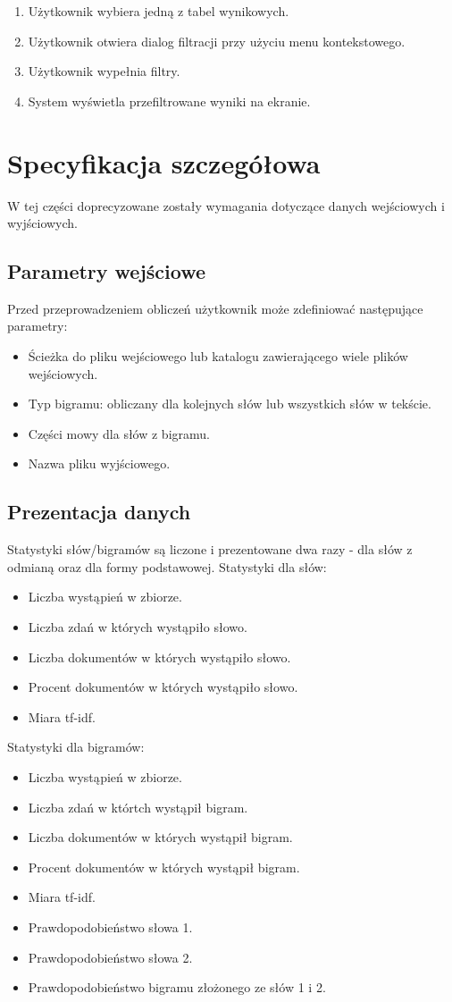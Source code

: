 \documentclass[11pt]{article}
\begin{document}
\begin{enumerate}
 \item Użytkownik wybiera jedną z tabel wynikowych.
 \item Użytkownik otwiera dialog filtracji przy użyciu menu kontekstowego.
 \item Użytkownik wypełnia filtry.
 \item System wyświetla przefiltrowane wyniki na ekranie.
\end{enumerate}

\section{Specyfikacja szczegółowa}
W tej części doprecyzowane zostały wymagania dotyczące danych wejściowych i wyjściowych.
\subsection{Parametry wejściowe}
Przed przeprowadzeniem obliczeń użytkownik może zdefiniować następujące parametry:
\begin{itemize}
 \item Ścieżka do pliku wejściowego lub katalogu zawierającego wiele plików wejściowych.
 \item Typ bigramu: obliczany dla kolejnych słów lub wszystkich słów w tekście.
 \item Części mowy dla słów z bigramu.
 \item Nazwa pliku wyjściowego.
\end{itemize}

\subsection{Prezentacja danych}
Statystyki słów/bigramów są liczone i prezentowane dwa razy - dla słów z odmianą oraz dla formy podstawowej.
Statystyki dla słów:
\begin{itemize}
 \item Liczba wystąpień w zbiorze.
 \item Liczba zdań w których wystąpiło słowo.
 \item Liczba dokumentów w których wystąpiło słowo.
 \item Procent dokumentów w których wystąpiło słowo.
 \item Miara tf-idf.
\end{itemize}

Statystyki dla bigramów:
\begin{itemize}
 \item Liczba wystąpień w zbiorze.
 \item Liczba zdań w którtch wystąpił bigram.
 \item Liczba dokumentów w których wystąpił bigram.
 \item Procent dokumentów w których wystąpił bigram.
 \item Miara tf-idf.
 \item Prawdopodobieństwo słowa 1.
 \item Prawdopodobieństwo słowa 2.
 \item Prawdopodobieństwo bigramu złożonego ze słów 1 i 2.
\end{itemize}
\end{document}
